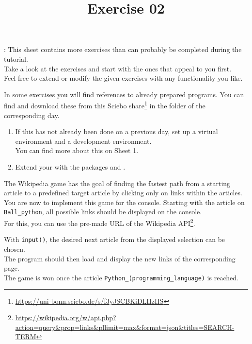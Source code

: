 \documentclass{config/minimal_uebungszettel}
\title{Exercise 02}
\theoremstyle{definition}
\newcommand{\pp}[1]{\lpl{#1}}
\newcommand{\furl}[1]{\footnote{\url{#1}}}
\begin{document}
\maketitle

\noindent {}: \quad
This sheet contains more exercises than can probably be completed during the tutorial.\\
Take a look at the exercises and start with the ones that appeal to you first.\\
Feel free to extend or modify the given exercises with any functionality you like.

\medskip

\noindent In some exercises you will find references to already prepared programs. You can find and download these from this Sciebo share\furl{https://uni-bonn.sciebo.de/s/f3yJSCBKiDLHzHS} in the folder of the corresponding day.

\medskip


\noindent {} \quad

    \begin{enumerate}
        \item If this has not already been done on a previous day, set up a virtual environment and a development environment.\\
        You can find more about this on Sheet 1.

        \item Extend your \pp{venv} with the packages \pp{fastapi} and \pp{requests}.
    \end{enumerate}

\medskip
\medskip


\medskip
\noindent {} \quad
  
    \noindent
    The Wikipedia game has the goal of finding the fastest path from a starting article to a predefined target article by clicking only on links within the articles. \\
    \noindent You are now to implement this game for the console.
    Starting with the article on \texttt{Ball\_python}, all possible links should be displayed on the console.\\

    \medskip 
    \noindent For this, you can use the pre-made URL of the Wikipedia API\footnote{\url{https://wikipedia.org/w/api.php?action=query&prop=links&pllimit=max&format=json&titles=SEARCH-TERM}}.

    \noindent With \texttt{input()}, the desired next article from the displayed selection can be chosen.\\
    The program should then load and display the new links of the corresponding page.\\
    \medskip
    The game is won once the article \texttt{Python\_(programming\_language)} is reached.
\end{document}

